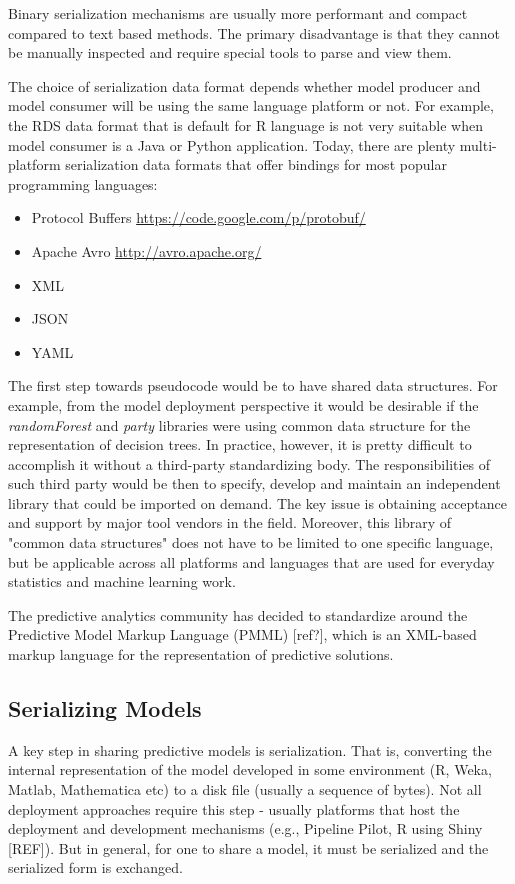 \documentclass[12pt,letterpaper]{article}
\begin{document}
Binary serialization mechanisms are usually more performant and 
compact compared to text based methods. The primary disadvantage is
that they cannot be manually inspected and require special tools to
parse and view them.

The choice of serialization data format depends whether model producer 
and model consumer will be using the same language platform or not. For
example, the RDS data format that is default for R language is not very
suitable when model consumer is a Java or Python application. Today,
there are plenty multi-platform serialization data formats that offer
bindings for most popular programming languages:
\begin{itemize}
  \item Protocol Buffers \url{https://code.google.com/p/protobuf/}
  \item Apache Avro \url{http://avro.apache.org/}
  \item XML
  \item JSON
  \item YAML
\end{itemize}

The first step towards pseudocode would be to have shared data structures.
For example, from the model deployment perspective it would be desirable
if the \textit{randomForest} and \textit{party} libraries were using common
data structure for the representation of decision trees. In practice,
however, it is pretty difficult to accomplish it without a third-party 
standardizing body. The responsibilities of such third party would be 
then to specify, develop and maintain an independent library that could
be imported on demand. The key issue is obtaining acceptance and support
by major tool vendors in the field. Moreover, this library of "common 
data structures" does not have to be limited to one specific language, but
be applicable across all platforms and languages that are used for
everyday statistics and machine learning work.

The predictive analytics community has decided to standardize around
the Predictive Model Markup Language (PMML) [ref?], which is an XML-based
markup language for the representation of predictive solutions. 

\subsection{Serializing Models}
\label{sec:serializing-models}

A key step in sharing predictive models is serialization. That is,
converting the internal representation of the model developed in some
environment (R, Weka, Matlab, Mathematica etc) to a disk file (usually
a sequence of bytes). Not all deployment approaches require this step
- usually platforms that host the deployment and development
mechanisms (e.g., Pipeline Pilot, R using Shiny [REF]). But in general, for one to share a
model, it must be serialized and the serialized form is exchanged.
\end{document}
